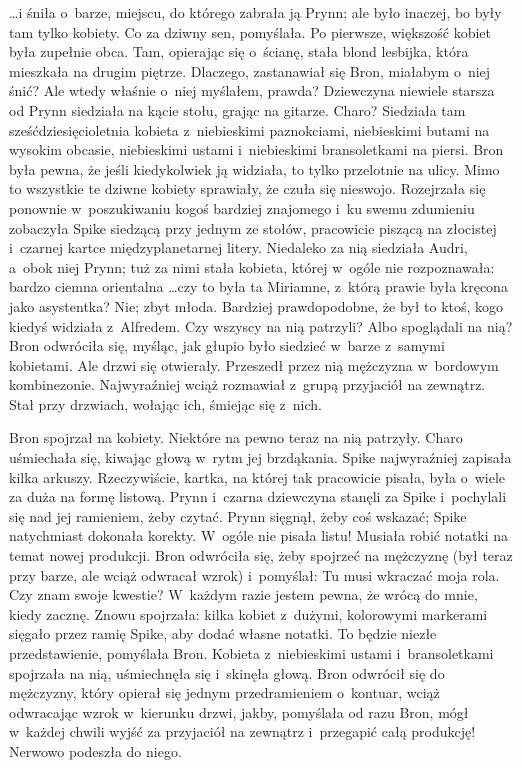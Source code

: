 \documentclass[oneside,polish,11pt,rmheadings]{mwbk}
\begin{document}
 \ldots i śniła o~barze, miejscu, do którego zabrała ją Prynn; ale było inaczej, bo były tam tylko kobiety. Co za dziwny sen, pomyślała. Po pierwsze, większość kobiet była zupełnie obca. Tam, opierając się o~ścianę, stała blond lesbijka, która mieszkała na drugim piętrze. Dlaczego, zastanawiał się Bron, miałabym o~niej śnić? Ale wtedy właśnie o~niej myślałem, prawda? Dziewczyna niewiele starsza od Prynn siedziała na kącie stołu, grając na gitarze. Charo? Siedziała tam sześćdziesięcioletnia kobieta z~niebieskimi paznokciami, niebieskimi butami na wysokim obcasie, niebieskimi ustami i~niebieskimi bransoletkami na piersi. Bron była pewna, że jeśli kiedykolwiek ją widziała, to tylko przelotnie na ulicy. Mimo to wszystkie te dziwne kobiety sprawiały, że czuła się nieswojo. Rozejrzała się ponownie w~poszukiwaniu kogoś bardziej znajomego i~ku swemu zdumieniu zobaczyła Spike siedzącą przy jednym ze stołów, pracowicie piszącą na złocistej i~czarnej kartce międzyplanetarnej litery. Niedaleko za nią siedziała Audri, a~obok niej Prynn; tuż za nimi stała kobieta, której w~ogóle nie rozpoznawała: bardzo ciemna orientalna \ldots  czy to była ta Miriamne, z~którą prawie była kręcona jako asystentka? Nie; zbyt młoda. Bardziej prawdopodobne, że był to ktoś, kogo kiedyś widziała z~Alfredem. Czy wszyscy na nią patrzyli? Albo spoglądali na nią? Bron odwróciła się, myśląc, jak głupio było siedzieć w~barze z~samymi kobietami. Ale drzwi się otwierały. Przeszedł przez nią mężczyzna w~bordowym kombinezonie. Najwyraźniej wciąż rozmawiał z~grupą przyjaciół na zewnątrz. Stał przy drzwiach, wołając ich, śmiejąc się z~nich. 

Bron spojrzał na kobiety. Niektóre na pewno teraz na nią patrzyły. Charo uśmiechała się, kiwając głową w~rytm jej brzdąkania. Spike najwyraźniej zapisała kilka arkuszy. Rzeczywiście, kartka, na której tak pracowicie pisała, była o~wiele za duża na formę listową. Prynn i~czarna dziewczyna stanęli za Spike i~pochylali się nad jej ramieniem, żeby czytać. Prynn sięgnął, żeby coś wskazać; Spike natychmiast dokonała korekty. W~ogóle nie pisała listu! Musiała robić notatki na temat nowej produkcji. Bron odwróciła się, żeby spojrzeć na mężczyznę (był teraz przy barze, ale wciąż odwracał wzrok) i~pomyślał: Tu musi wkraczać moja rola. Czy znam swoje kwestie? W~każdym razie jestem pewna, że wrócą do mnie, kiedy zacznę. Znowu spojrzała: kilka kobiet z~dużymi, kolorowymi markerami sięgało przez ramię Spike, aby dodać własne notatki. To będzie niezłe przedstawienie, pomyślała Bron. Kobieta z~niebieskimi ustami i~bransoletkami spojrzała na nią, uśmiechnęła się i~skinęła głową. Bron odwrócił się do mężczyzny, który opierał się jednym przedramieniem o~kontuar, wciąż odwracając wzrok w~kierunku drzwi, jakby, pomyślała od razu Bron, mógł w~każdej chwili wyjść za przyjaciół na zewnątrz i~przegapić całą produkcję! Nerwowo podeszła do niego. 
\end{document}
